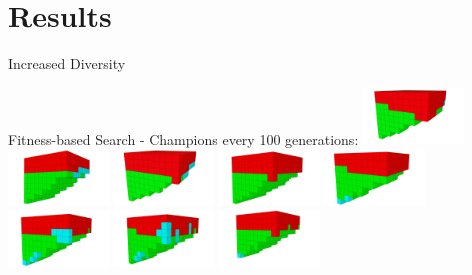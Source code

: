 \documentclass[6pt]{beamer}
\begin{document}
\section{Results}

{

\begin{frame}{Increased Diversity}
\begin{block}{Fitness-based Search - Champions every 100 generations:}
\includegraphics[width=0.2\textwidth]{../Figures/Robots/f_4_g_100.jpg}
\includegraphics[width=0.2\textwidth]{../Figures/Robots/f_4_g_200.jpg}
\includegraphics[width=0.2\textwidth]{../Figures/Robots/f_4_g_300.jpg}
\includegraphics[width=0.2\textwidth]{../Figures/Robots/f_4_g_400.jpg}
\includegraphics[width=0.2\textwidth]{../Figures/Robots/f_4_g_500.jpg}\\
\includegraphics[width=0.2\textwidth]{../Figures/Robots/f_4_g_600.jpg}
\includegraphics[width=0.2\textwidth]{../Figures/Robots/f_4_g_700.jpg}
\includegraphics[width=0.2\textwidth]{../Figures/Robots/f_4_g_800.jpg}

\end{block}
\end{frame}}
\end{document}
